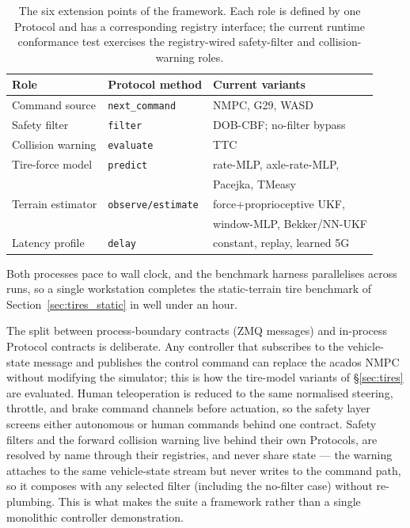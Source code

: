\documentclass[conference,letterpaper,10pt]{IEEEtran}
\begin{document}
\begin{table}[!t]
  \renewcommand{\arraystretch}{1.15}
  \caption{The six extension points of the framework. Each role is
    defined by one Protocol and has a corresponding registry interface;
    the current runtime conformance test exercises the registry-wired
    safety-filter and collision-warning roles.}
  \label{tab:swap_points}
  \centering
  \scriptsize
  \setlength{\tabcolsep}{3pt}
  \begin{tabular}{@{}lll@{}}
    \toprule
    \textbf{Role} & \textbf{Protocol method} & \textbf{Current variants}\\
    \midrule
    Command source     & \texttt{next\_command}  & NMPC, G29, WASD\\
    Safety filter      & \texttt{filter}         & DOB-CBF; no-filter bypass\\
    Collision warning  & \texttt{evaluate}       & TTC\\
    Tire-force model   & \texttt{predict}        & rate-MLP, axle-rate-MLP,\\
                       &                         & Pacejka, TMeasy\\
    Terrain estimator  & \texttt{observe/estimate} & force+proprioceptive UKF,\\
                       &                         & window-MLP, Bekker/NN-UKF\\
    Latency profile    & \texttt{delay}          & constant, replay, learned 5G\\
    \bottomrule
  \end{tabular}
\end{table}

Both processes pace to wall clock, and the benchmark harness
parallelises across runs, so a single workstation completes the
static-terrain tire benchmark of Section~\ref{sec:tires_static} in
well under an hour.

The split between process-boundary contracts (ZMQ messages) and
in-process Protocol contracts is deliberate. Any controller that
subscribes to the vehicle-state message and publishes the
control command can replace the acados NMPC without
modifying the simulator; this is how the tire-model variants of
\S\ref{sec:tires} are evaluated. Human teleoperation is reduced to
the same normalised steering, throttle, and brake command channels
before actuation, so the safety layer screens either autonomous or
human commands behind one contract. Safety filters and the forward
collision warning live behind their own Protocols, are resolved by
name through their registries, and never share state — the warning
attaches to the same vehicle-state stream but never writes to the
command path, so it composes with any selected filter (including the
no-filter case) without re-plumbing. This is what makes the suite a
framework rather than a single monolithic controller demonstration.
\end{document}
